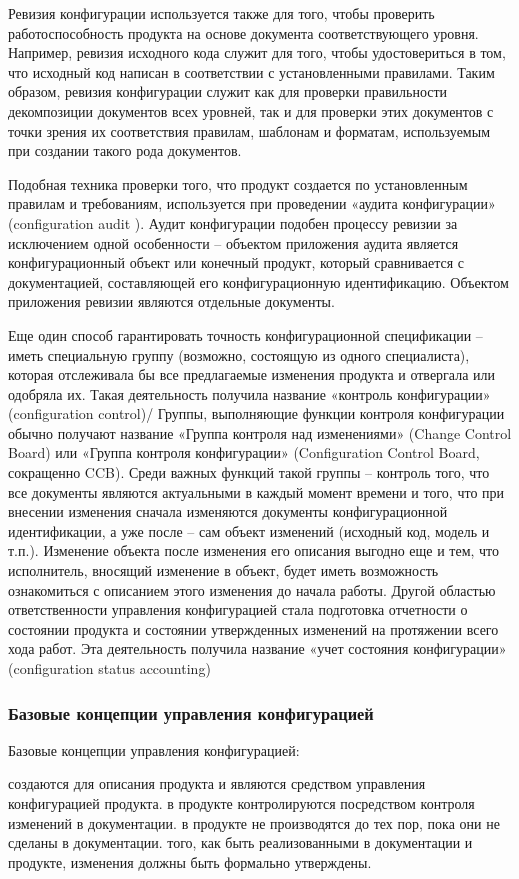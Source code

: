 \documentclass{../industrial-development}
\begin{document}
Ревизия конфигурации используется также для того, чтобы проверить работоспособность продукта на основе документа соответствующего уровня. Например, ревизия исходного кода служит для того, чтобы удостовериться в том, что исходный код написан в соответствии с установленными правилами. Таким образом, ревизия конфигурации служит как для проверки правильности декомпозиции документов всех уровней, так и для проверки этих документов с точки зрения их соответствия правилам, шаблонам и форматам, используемым при создании такого рода документов.

Подобная техника проверки того, что продукт создается по установленным правилам и требованиям, используется при проведении «аудита конфигурации» (configuration audit ). Аудит конфигурации подобен процессу ревизии за исключением одной особенности – объектом приложения аудита является конфигурационный объект или конечный продукт, который сравнивается с документацией, составляющей его конфигурационную идентификацию. Объектом приложения ревизии являются отдельные документы.

Еще один способ гарантировать точность конфигурационной спецификации – иметь специальную группу (возможно, состоящую из одного специалиста), которая отслеживала бы все предлагаемые изменения продукта и отвергала или одобряла их. Такая деятельность получила название «контроль конфигурации» (configuration control)/ Группы, выполняющие функции контроля конфигурации обычно получают название «Группа контроля над изменениями» (Change Control Board) или «Группа контроля конфигурации» (Configuration Control Board, сокращенно CCB). Среди важных функций такой группы – контроль того, что все документы являются актуальными в каждый момент времени и того, что при внесении изменения сначала изменяются документы конфигурационной идентификации, а уже после – сам объект изменений (исходный код, модель и т.п.). Изменение объекта после изменения его описания выгодно еще и тем, что исполнитель, вносящий изменение в объект, будет иметь возможность ознакомиться с описанием этого изменения до начала работы.
Другой областью ответственности управления конфигурацией стала подготовка отчетности о состоянии продукта и состоянии утвержденных изменений на протяжении всего хода работ. Эта деятельность получила название «учет состояния конфигурации» (configuration status accounting)~\cite{Managing}

\begin{frame} \frametitle{Базовые концепции управления конфигурацией}
  \begin{block}{Базовые концепции управления конфигурацией:}
  \begin{itemize}
 создаются для описания продукта и являются средством управления конфигурацией продукта.
 в продукте контролируются посредством контроля изменений в документации.
 в продукте не производятся до тех пор, пока они не сделаны в документации.
 того, как быть реализованными в документации и продукте, изменения должны быть формально утверждены.
  \end{itemize}
	\end{block}
\end{frame}
\end{document}
